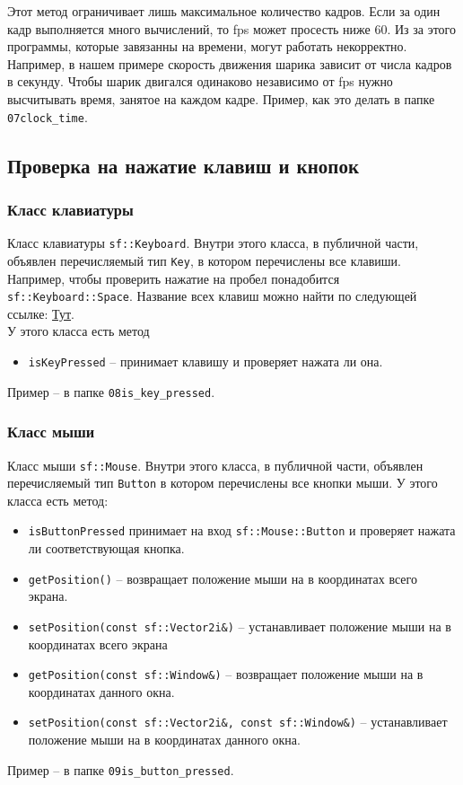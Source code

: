 \documentclass{article}
\begin{document}
Этот метод ограничивает лишь максимальное количество кадров. Если за один кадр выполняется много вычислений, то fps может просесть ниже 60. Из за этого программы, которые завязанны на времени, могут работать некорректно. Например, в нашем примере скорость движения шарика зависит от числа кадров в секунду. Чтобы шарик двигался одинаково независимо от fps нужно высчитывать время, занятое на каждом кадре. Пример, как это делать в папке \texttt{07clock\_time}.



\subsection*{Проверка на нажатие клавиш и кнопок}
\subsubsection*{Класс клавиатуры}
Класс клавиатуры \texttt{sf::Keyboard}. Внутри этого класса, в публичной части, объявлен перечисляемый тип \texttt{Key}, в котором перечислены все клавиши. Например, чтобы проверить нажатие на пробел понадобится \texttt{sf::Keyboard::Space}. Название всех клавиш можно найти по следующей ссылке: \href{https://www.sfml-dev.org/documentation/2.5.1/classsf_1_1Keyboard.php}{Тут}.\\
У этого класса есть метод 
\begin{itemize}
\item \texttt{isKeyPressed} -- принимает клавишу и проверяет нажата ли она.
\end{itemize}
Пример -- в папке \texttt{08is\_key\_pressed}.


\subsubsection*{Класс мыши}
Класс мыши \texttt{sf::Mouse}. Внутри этого класса, в публичной части, объявлен перечисляемый тип \texttt{Button} в котором перечислены все кнопки мыши.
У этого класса есть метод:
\begin{itemize}
\item \texttt{isButtonPressed} принимает на вход \texttt{sf::Mouse::Button} и проверяет нажата ли соответствующая кнопка.
\item \texttt{getPosition()} -- возвращает положение мыши на в координатах всего экрана.
\item \texttt{setPosition(const sf::Vector2i\&)} --  устанавливает положение мыши на в координатах всего экрана
\item \texttt{getPosition(const sf::Window\&)} -- возвращает положение мыши на в координатах данного окна.
\item \texttt{setPosition(const sf::Vector2i\&, const sf::Window\&)} --  устанавливает положение мыши на в координатах данного окна.
\end{itemize}
Пример -- в папке \texttt{09is\_button\_pressed}.
\end{document}
